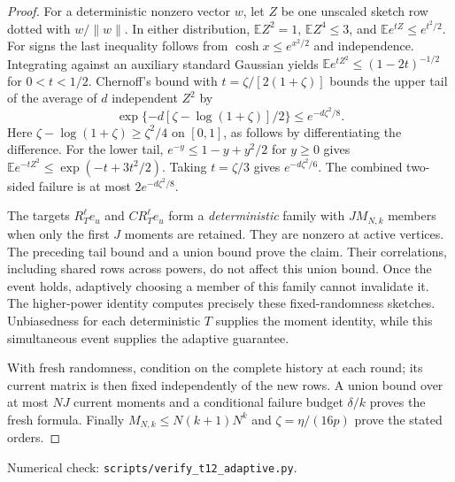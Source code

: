 \documentclass[11pt]{article}
\newcommand{\E}{\mathbb E}
\begin{document}
\begin{proof}
For a deterministic nonzero vector $w$, let $Z$ be one
unscaled sketch row dotted with $w/\|w\|$. In either distribution,
$\E Z^2=1$, $\E Z^4\leq3$, and
$\E e^{tZ}\leq e^{t^2/2}$. For signs the last inequality follows
from $\cosh x\leq e^{x^2/2}$ and independence. Integrating
against an auxiliary standard Gaussian yields
$\E e^{tZ^2}\leq(1-2t)^{-1/2}$ for $0<t<1/2$.
Chernoff's bound with $t=\zeta/[2(1+\zeta)]$ bounds the upper
tail of the average of $d$ independent $Z^2$ by
\[
 \exp\{-d[\zeta-\log(1+\zeta)]/2\}
 \leq e^{-d\zeta^2/8}.
\]
Here $\zeta-\log(1+\zeta)\geq\zeta^2/4$ on $[0,1]$, as
follows by differentiating the difference.
For the lower tail, $e^{-y}\leq1-y+y^2/2$ for $y\geq0$
gives $\E e^{-tZ^2}\leq\exp(-t+3t^2/2)$.
Taking $t=\zeta/3$ gives $e^{-d\zeta^2/6}$.
The combined two-sided failure is at most $2e^{-d\zeta^2/8}$.

The targets $R_T^\ell e_u$ and $CR_T^\ell e_u$ form a
\emph{deterministic} family with $JM_{N,k}$ members when only
the first $J$ moments are retained. They are nonzero at active
vertices. The preceding tail bound and a union bound prove the
claim. Their correlations, including shared rows across powers,
do not affect this union bound. Once the event holds, adaptively
choosing a member of this family cannot invalidate it.
The higher-power identity computes precisely these fixed-randomness
sketches. Unbiasedness for each deterministic $T$ supplies the
moment identity, while this simultaneous event supplies the
adaptive guarantee.

With fresh randomness, condition on the complete history at each
round; its current matrix is then fixed independently of the new
rows. A union bound over at most $NJ$ current moments and a
conditional failure budget $\delta/k$ proves the fresh formula.
Finally $M_{N,k}\leq N(k+1)N^k$ and
$\zeta=\eta/(16p)$ prove the stated orders.
\end{proof}
\noindent Numerical check:
\texttt{scripts/verify\_t12\_adaptive.py}.
\end{document}
